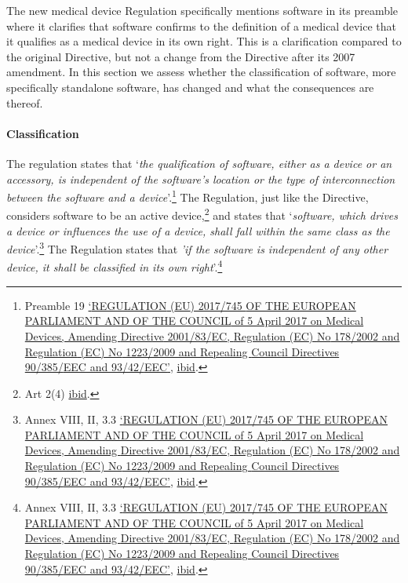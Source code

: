 \documentclass[
]{scrartcl}
\begin{document}
The new medical device Regulation specifically mentions software in its preamble where it clarifies that software confirms to the definition of a medical device that it qualifies as a medical device in its own right. This is a clarification compared to the original Directive, but not a change from the Directive after its 2007 amendment. In this section we assess whether the classification of software, more specifically standalone software, has changed and what the consequences are thereof.

\hypertarget{classification}{%
\paragraph{Classification}\label{classification}}

The regulation states that `\emph{the qualification of software, either as a device or an accessory, is independent of the software's location or the type of interconnection between the software and a device}'.\footnote{Preamble 19 \protect\hyperlink{ref-REGULATIONEU2017a}{{`{REGULATION} ({EU}) 2017/745 {OF THE EUROPEAN PARLIAMENT AND OF THE COUNCIL} of 5 {April} 2017 on Medical Devices, Amending {Directive} 2001/83/{EC}, {Regulation} ({EC}) {No} 178/2002 and {Regulation} ({EC}) {No} 1223/2009 and Repealing {Council Directives} 90/385/{EEC} and 93/42/{EEC}'}}, \protect\hyperlink{ref-REGULATIONEU2017a}{ibid}.} The Regulation, just like the Directive, considers software to be an active device,\footnote{Art 2(4) \protect\hyperlink{ref-REGULATIONEU2017a}{ibid}.} and states that `\emph{software, which drives a device or influences the use of a device, shall fall within the same class as the device}'.\footnote{Annex VIII, II, 3.3 \protect\hyperlink{ref-REGULATIONEU2017a}{{`{REGULATION} ({EU}) 2017/745 {OF THE EUROPEAN PARLIAMENT AND OF THE COUNCIL} of 5 {April} 2017 on Medical Devices, Amending {Directive} 2001/83/{EC}, {Regulation} ({EC}) {No} 178/2002 and {Regulation} ({EC}) {No} 1223/2009 and Repealing {Council Directives} 90/385/{EEC} and 93/42/{EEC}'}}, \protect\hyperlink{ref-REGULATIONEU2017a}{ibid}.} The Regulation states that \emph{'if the software is independent of any other device, it shall be classified in its own right}'.\footnote{Annex VIII, II, 3.3 \protect\hyperlink{ref-REGULATIONEU2017a}{{`{REGULATION} ({EU}) 2017/745 {OF THE EUROPEAN PARLIAMENT AND OF THE COUNCIL} of 5 {April} 2017 on Medical Devices, Amending {Directive} 2001/83/{EC}, {Regulation} ({EC}) {No} 178/2002 and {Regulation} ({EC}) {No} 1223/2009 and Repealing {Council Directives} 90/385/{EEC} and 93/42/{EEC}'}}, \protect\hyperlink{ref-REGULATIONEU2017a}{ibid}.}
\end{document}
